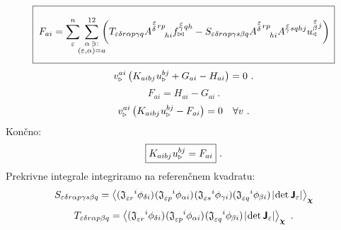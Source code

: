\vspace{1mm}
\begin{equation}
   \boxed{ \phantom{\rule[-9mm]{1mm}{18mm}}
   F_{ai} =
   \sum^n_\varepsilon
   \mkern-7mu
   \sum_{\substack{\alpha \, \ni: \\ (\varepsilon,\alpha) = a}}^{12}
   \mkern-10mu
   \qty(
   T_{\varepsilon \delta r \alpha p \gamma q}
   A^{\substack{\mkern2mu \varepsilon \\[0.12mm] \delta} \mkern2mu r p}_{\mkern29mu hi}    f^{\substack{\mkern2mu \varepsilon \\[-0.59mm] \gamma} \mkern2mu q h}_{\bowtie}
   -
   S_{\varepsilon \delta r \alpha p \gamma s \beta q}    A^{\substack{\mkern2mu \varepsilon \\[0.12mm] \delta} \mkern2mu r p}_{\mkern29mu h i}    A^{\substack{\mkern2mu \varepsilon \\[-0.59mm] \gamma} \mkern2mu s q h j}    u^{\substack{\mkern2mu \varepsilon \\[0.14mm] \beta} \mkern2mu j}_\triangleleft ) \mkern3mu }
\end{equation}
\begin{equation*}
   v^{a i}_{\triangleright} \left(
   K_{a i b j} \mkern1mu u^{b j}_\triangleright
   +
   G_{a i}
   -
   H_{a i}
   \right) = 0 \ .
\end{equation*}
\begin{equation*}
   F_{a i} = H_{a i} - G_{a i} \ .
\end{equation*}
\begin{equation*}
   v^{a i}_{\triangleright} \left(
   K_{a i b j} \mkern1mu u^{b j}_\triangleright
   -
   F_{a i}
   \right) = 0 \quad \forall v \ .
\end{equation*}
Končno:
\begin{equation}
   \boxed{
   K_{a i b j} \mkern1mu u^{b j}_\triangleright
   =
   F_{a i} } \ .
\end{equation}
Prekrivne integrale integriramo na referenčnem kvadratu:
\begin{equation}
   S_{\varepsilon \delta r \alpha p \gamma s \beta q} = \expval{ (\mathfrak{J}_{\varepsilon r}^{\mkern18mu i} \phi_{\delta i}) \mkern1mu ( \mathfrak{J}_{\varepsilon p}^{\mkern18mu i} \phi_{\alpha i} ) \mkern1mu (\mathfrak{J}_{\varepsilon s}^{\mkern18mu i} \phi_{\gamma i}) ( \mathfrak{J}_{\varepsilon q}^{\mkern18mu i}  \phi_{\mkern-1mu \beta i} ) \mkern2mu |\mkern-2mu \det \bm{\mathsf{J}}_\varepsilon | }_{\bm{\chi}}
\end{equation}
\begin{equation}
   T_{\varepsilon \delta r \alpha p \beta q} = \expval{ (\mathfrak{J}_{\varepsilon r}^{\mkern18mu i} \phi_{\delta i}) \mkern1mu ( \mathfrak{J}_{\varepsilon p}^{\mkern18mu i} \phi_{\alpha i} ) \mkern1mu   ( \mathfrak{J}_{\varepsilon q}^{\mkern18mu i}  \phi_{\mkern-1mu \beta i} ) \mkern2mu |\mkern-2mu \det \bm{\mathsf{J}}_\varepsilon | }_{\bm{\chi}} \ .
\end{equation}
